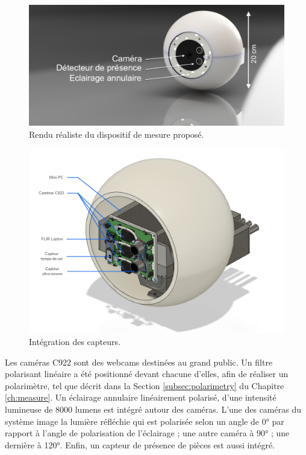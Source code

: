 \begin{figure}[thbp]
	\centering
	\includegraphics[width=\textwidth,height=\textheight,keepaspectratio]{../Chap5/Figures/Rendu_TE-1_2019-Jan-23_06-00-31PM_withText.png}
	\caption{Rendu réaliste du dispositif de mesure proposé.}
	\label{fig:design}
\end{figure}

\begin{figure}[hbtp]
	\centering
	\includegraphics[width=\textwidth,height=\textheight,keepaspectratio]{../Chap5/Figures/Capture-2019-11-05-11-59-31-copie.jpg}
	\caption{Intégration des capteurs.}
	\label{fig:integration}
\end{figure}

Les caméras C922 sont des webcams destinées au grand public.
Un filtre polarisant linéaire a été positionné devant chacune d'elles, afin de réaliser un polarimètre, tel que décrit dans la Section \ref{subsec:polarimetry} du Chapitre \ref{ch:measure}.
Un éclairage annulaire linéairement polarisé, d'une intensité lumineuse de 8000 lumens est intégré autour des caméras.
L'une des caméras du système image la lumière réfléchie qui est polarisée selon un angle de 0° par rapport à l'angle de polarisation de l'éclairage ; une autre caméra à 90° ; une dernière à 120°.
Enfin, un capteur de présence de pièces est aussi intégré.

